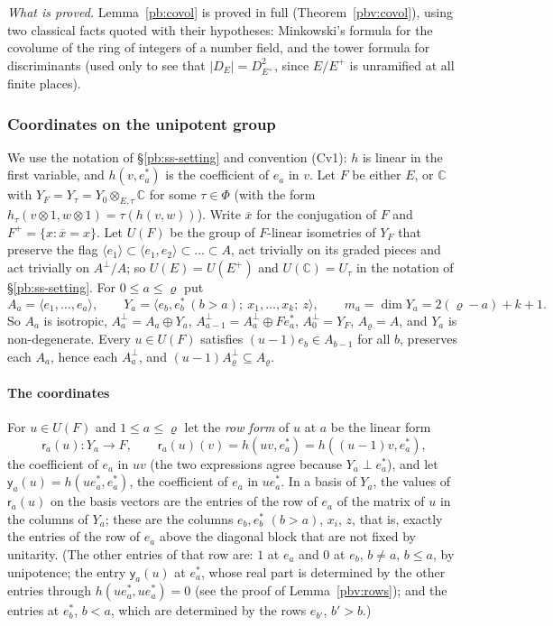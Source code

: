 \documentclass[10pt]{amsart}
\theoremstyle{definition}
\theoremstyle{remark}
\newcommand{\C}{\mathbb C}
\providecommand{\auPl}{\Phi}
\providecommand{\aubar}[1]{\overline{#1}}
\begin{document}
\emph{What is proved.} Lemma~\ref{pb:covol} is proved in full (Theorem~\ref{pbv:covol}), using two
classical facts quoted with their hypotheses: Minkowski's formula for the covolume of the ring of
integers of a number field, and the tower formula for discriminants (used only to see that
$|D_E|=D_{E^+}^2$, since $E/E^+$ is unramified at all finite places).

\subsubsection{Coordinates on the unipotent group}\label{pbv:ss-coord}

We use the notation of \S\ref{pb:ss-setting} and convention (Cv1): $h$ is linear in the first
variable, and $h(v,e_a^*)$ is the coefficient of $e_a$ in $v$. Let $F$ be either $E$, or $\C$ with
$Y_F=Y_\tau=Y_0\otimes_{E,\tau}\C$ for some $\tau\in\auPl$ (with the form $h_\tau(v\otimes1,w\otimes
1)=\tau(h(v,w))$). Write $\aubar x$ for the conjugation of $F$ and $F^+=\{x:\aubar x=x\}$. Let
$U(F)$ be the group of $F$-linear isometries of $Y_F$ that preserve the flag $\langle e_1\rangle
\subset\langle e_1,e_2\rangle\subset\dots\subset A$, act trivially on its graded pieces and act
trivially on $A^\perp/A$; so $U(E)=U(E^+)$ and $U(\C)=U_\tau$ in the notation of
\S\ref{pb:ss-setting}. For $0\le a\le\varrho$ put
\[
A_a=\langle e_1,\dots,e_a\rangle,\qquad Y_a=\langle e_b,e_b^*\ (b>a);\ x_1,\dots,x_k;\ z\rangle,
\qquad m_a=\dim Y_a=2(\varrho-a)+k+1 .
\]
So $A_a$ is isotropic, $A_a^\perp=A_a\oplus Y_a$, $A_{a-1}^\perp=A_a^\perp\oplus Fe_a^*$, $A_0^\perp=Y_F$,
$A_\varrho=A$, and $Y_a$ is non-degenerate. Every $u\in U(F)$ satisfies $(u-1)e_b\in A_{b-1}$ for all
$b$, preserves each $A_a$, hence each $A_a^\perp$, and $(u-1)A_\varrho^\perp\subseteq A_\varrho$.

\paragraph*{The coordinates}
For $u\in U(F)$ and $1\le a\le\varrho$ let the \emph{row form} of $u$ at $a$ be the linear form
\[
\mathsf r_a(u)\colon Y_a\to F,\qquad \mathsf r_a(u)(v)=h(uv,e_a^*)=h((u-1)v,e_a^*),
\]
the coefficient of $e_a$ in $uv$ (the two expressions agree because $Y_a\perp e_a^*$), and let
$\mathsf y_a(u)=h(ue_a^*,e_a^*)$, the coefficient of $e_a$ in $ue_a^*$. In a basis of $Y_a$, the values
of $\mathsf r_a(u)$ on the basis vectors are the entries of the row of $e_a$ of the matrix of $u$ in the
columns of $Y_a$; these are the columns $e_b,e_b^*$ $(b>a)$, $x_i$, $z$, that is, exactly the entries
of the row of $e_a$ above the diagonal block that are not fixed by unitarity. (The other entries of
that row are: $1$ at $e_a$ and $0$ at $e_b$, $b\ne a$, $b\le a$, by unipotence; the entry
$\mathsf y_a(u)$ at $e_a^*$, whose real part is determined by the other entries through
$h(ue_a^*,ue_a^*)=0$ (see the proof of Lemma~\ref{pbv:rows}); and the entries at $e_b^*$, $b<a$, which are determined by the rows $e_{b'}$,
$b'>b$.)
\end{document}
